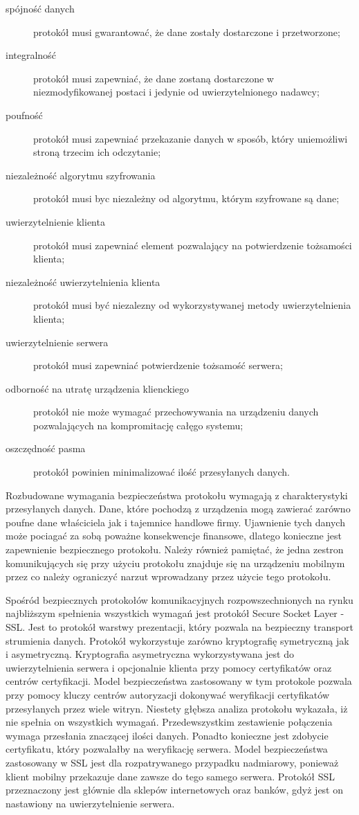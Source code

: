 \begin{description}
\item[spójność danych] protokół musi gwarantować, że dane zostały
  dostarczone i przetworzone;
\item[integralność] protokół musi zapewniać, że dane zostaną
  dostarczone w niezmodyfikowanej postaci i jedynie od
  uwierzytelnionego nadawcy;
\item[poufność] protokół musi zapewniać przekazanie danych w sposób,
  który uniemożliwi stroną trzecim ich odczytanie;
\item[niezależność algorytmu szyfrowania] protokół musi byc niezależny
  od algorytmu, którym szyfrowane są dane;
\item[uwierzytelnienie klienta] protokół musi zapewniać element
  pozwalający na potwierdzenie tożsamości klienta;
\item[niezależność uwierzytelnienia klienta] protokół musi być
  niezalezny od wykorzystywanej metody uwierzytelnienia klienta;
\item[uwierzytelnienie serwera] protokół musi zapewniać potwierdzenie
  tożsamość serwera;
\item[odborność na utratę urządzenia klienckiego] protokół nie może
  wymagać przechowywania na urządzeniu danych pozwalających na
  kompromitację całęgo systemu;
\item[oszczędność pasma] protokół powinien minimalizować ilość
  przesyłanych danych.
\end{description}

Rozbudowane wymagania bezpieczeństwa protokołu wymagają z
charakterystyki przesyłanych danych. Dane, które pochodzą z urządzenia
mogą zawierać zarówno poufne dane właściciela jak i tajemnice handlowe
firmy. Ujawnienie tych danych może pociagać za sobą poważne
konsekwencje finansowe, dlatego konieczne jest zapewnienie
bezpiecznego protokołu. Należy również pamiętać, że jedna zestron
komunikujących się przy użyciu protokołu znajduje się na urządzeniu
mobilnym przez co należy ograniczyć narzut wprowadzany przez użycie
tego protokołu.

Spośród bezpiecznych protokołów komunikacyjnych rozpowszechnionych na
rynku najbliższym spełnienia wszystkich wymagań jest protokół Secure
Socket Layer - SSL. Jest to protokół warstwy prezentacji, który
pozwala na bezpieczny transport strumienia danych. Protokół
wykorzystuje zarówno kryptografię symetryczną jak i
asymetryczną. Kryptografia asymetryczna wykorzystywana jest do
uwierzytelnienia serwera i opcjonalnie klienta przy pomocy
certyfikatów oraz centrów certyfikacji. Model bezpieczeństwa
zastosowany w tym protokole pozwala przy pomocy kluczy centrów
autoryzacji dokonywać weryfikacji certyfikatów przesyłanych przez
wiele witryn. Niestety głębsza analiza protokołu wykazała, iż nie
spełnia on wszystkich wymagań. Przedewszystkim zestawienie połączenia
wymaga przesłania znaczącej ilości danych. Ponadto konieczne jest
zdobycie certyfikatu, który pozwalałby na weryfikację serwera. Model
bezpieczeństwa zastosowany w SSL jest dla rozpatrywanego przypadku
nadmiarowy, ponieważ klient mobilny przekazuje dane zawsze do tego
samego serwera. Protokół SSL przeznaczony jest głównie dla sklepów
internetowych oraz banków, gdyż jest on nastawiony na uwierzytelnienie
serwera.

